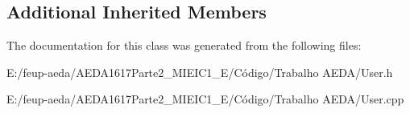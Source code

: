 \subsection*{Additional Inherited Members}


The documentation for this class was generated from the following files\+:\begin{DoxyCompactItemize}
\item 
E\+:/feup-\/aeda/\+A\+E\+D\+A1617\+Parte2\+\_\+M\+I\+E\+I\+C1\+\_\+\+E/\+Código/\+Trabalho A\+E\+D\+A/User.\+h\item 
E\+:/feup-\/aeda/\+A\+E\+D\+A1617\+Parte2\+\_\+M\+I\+E\+I\+C1\+\_\+\+E/\+Código/\+Trabalho A\+E\+D\+A/User.\+cpp\end{DoxyCompactItemize}
